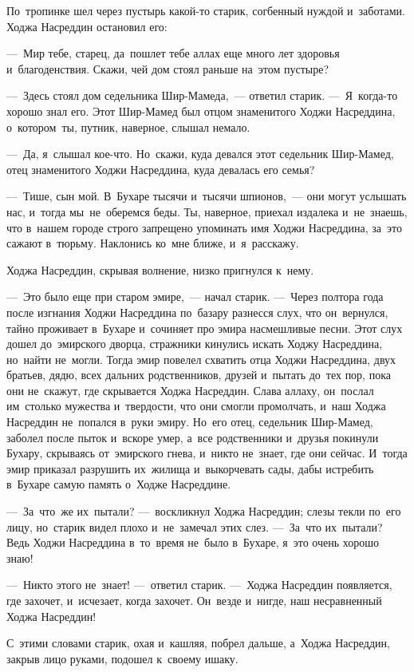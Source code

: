 \documentclass[12pt,a4paper]{book}
\begin{document}
По~тропинке шел через пустырь какой-то старик, согбенный нуждой и~заботами. Ходжа Насреддин остановил его:

—~Мир тебе, старец, да~пошлет тебе аллах еще много лет здоровья и~благоденствия. Скажи, чей дом стоял раньше на~этом пустыре?

—~Здесь стоял дом седельника Шир-Мамеда,~— ответил старик. —~Я~когда-то хорошо знал его. Этот Шир-Мамед был отцом знаменитого Ходжи Насреддина, о~котором~ты, путник, наверное, слышал немало.

—~Да, я~слышал кое-что. Но~скажи, куда девался этот седельник Шир-Мамед, отец знаменитого Ходжи Насреддина, куда девалась его семья?

—~Тише, сын мой. В~Бухаре тысячи и~тысячи шпионов,~— они могут услышать нас, и~тогда мы~не~оберемся беды. Ты, наверное, приехал издалека и~не~знаешь, что в~нашем городе строго запрещено упоминать имя Ходжи Насреддина, за~это сажают в~тюрьму. Наклонись ко~мне ближе, и~я~расскажу.

Ходжа Насреддин, скрывая волнение, низко пригнулся к~нему.

—~Это было еще при старом эмире,~— начал старик. —~Через полтора года после изгнания Ходжи Насреддина по~базару разнесся слух, что он~вернулся, тайно проживает в~Бухаре и~сочиняет про эмира насмешливые песни. Этот слух дошел до~эмирского дворца, стражники кинулись искать Ходжу Насреддина, но~найти не~могли. Тогда эмир повелел схватить отца Ходжи Насреддина, двух братьев, дядю, всех дальних родственников, друзей и~пытать до~тех пор, пока они не~скажут, где скрывается Ходжа Насреддин. Слава аллаху, он~послал им~столько мужества и~твердости, что они смогли промолчать, и~наш Ходжа Насреддин не~попался в~руки эмиру. Но~его отец, седельник Шир-Мамед, заболел после пыток и~вскоре умер, а~все родственники и~друзья покинули Бухару, скрываясь от~эмирского гнева, и~никто не~знает, где они сейчас. И~тогда эмир приказал разрушить их~жилища и~выкорчевать сады, дабы истребить в~Бухаре самую память о~Ходже Насреддине.

—~За~что~же их~пытали? —~воскликнул Ходжа Насреддин; слезы текли по~его лицу, но~старик видел плохо и~не~замечал этих слез. —~За~что их~пытали? Ведь Ходжи Насреддина в~то~время не~было в~Бухаре, я~это очень хорошо знаю!

—~Никто этого не~знает! —~ответил старик. —~Ходжа Насреддин появляется, где захочет, и~исчезает, когда захочет. Он~везде и~нигде, наш несравненный Ходжа Насреддин!

С~этими словами старик, охая и~кашляя, побрел дальше, а~Ходжа Насреддин, закрыв лицо руками, подошел к~своему ишаку.
\end{document}
